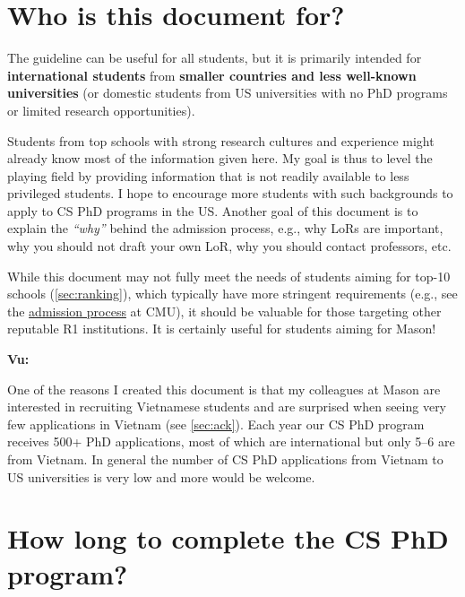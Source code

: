 \documentclass[oneside,11pt,dvipsnames]{book}
\newenvironment{commentbox}[1][]{
  \small
  \begin{mybox}
    {\small \textbf{#1}}
  }{
  \end{mybox}
}
\def\sectioninfo#1{%
  \addcontentsline{toc}{sectioninfo}{%
    \noexpand\numberline{}\color{black}{#1}}%
}
\begin{document}
\section{Who is this document for?}
\sectioninfo{This document is intended for international students from smaller countries and domestic students from less well-known universities.}

The guideline can be useful for all students, but it is primarily intended for \textbf{international students} from \textbf{smaller countries and less well-known universities} (or domestic students from US universities with no PhD programs or limited research opportunities).

Students from top schools with strong research cultures and experience might already know most of the information given here.
My goal is thus to level the playing field by providing information that is not readily available to less privileged students. 
I hope to encourage more students with such backgrounds to apply to CS PhD programs in the US.
Another goal of this document is to explain the \emph{``why''} behind the admission process, e.g., why LoRs are important, why you should not draft your own LoR, why you should contact professors, etc.  

While this document may not fully meet the needs of students aiming for top-10 schools (\autoref{sec:ranking}), which typically have more stringent requirements (e.g., see the \href{https://da-data.blogspot.com/2015/03/reflecting-on-cs-graduate-admissions.html}{admission process} at CMU), it should be valuable for those targeting other reputable R1 institutions. It is certainly useful for students aiming for Mason!

\begin{commentbox}[Vu:]
    One of the reasons I created this document is that my colleagues at Mason are interested in recruiting Vietnamese students and are surprised when seeing very few applications in Vietnam (see \autoref{sec:ack}). Each year our CS PhD program receives 500+ PhD applications, most of which are international but only 5--6 are from Vietnam. In general the number of CS PhD applications from Vietnam to US universities is very low and more would be welcome.
  \end{commentbox}
  
  
\section{How long to complete the CS PhD program?}\label{sec:time}
\sectioninfo{About 5--7 years in the US.}
\end{document}

